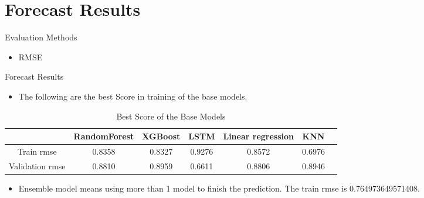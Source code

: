 \documentclass[
 size=12pt,
 paper=smartboard, %
 mode=present, %
 display=slides, %
 style=tuliplab,  %
 pauseslide,
 fleqn,leqno,clock]{powerdot}
\begin{document}
\section{Forecast Results}

\begin{slide}{Evaluation Methods}
	\begin{center}
		\begin{itemize}
			\item RMSE
		\end{itemize}
	\end{center}

\end{slide}
\begin{slide}{Forecast Results}
	\begin{itemize}
		\item The following are the best Score in training of the base models.
	\end{itemize}
	\begin{center}
		\begin{table}[h]  \centering
			\caption{Best Score of the Base Models}
			\label{tbl:best_score_base_models_old}
			\begin{tabular}{ccccccc}
				\toprule
				                & RandomForest & XGBoost & LSTM   & Linear regression & KNN
				\\
				\midrule
				Train rmse      & 0.8358       & 0.8327  & 0.9276 &
				0.8572          & 0.6976                                                    \\
				Validation rmse & 0.8810       & 0.8959  & 0.6611 &
				0.8806          & 0.8946                                                    \\
				\bottomrule
			\end{tabular}
		\end{table}
	\end{center}
	\begin{itemize}
		\item Ensemble model means using
		      more than 1 model to finish the prediction.
		      The train rmse is 0.764973649571408.
	\end{itemize}

\end{slide}


\end{document}
